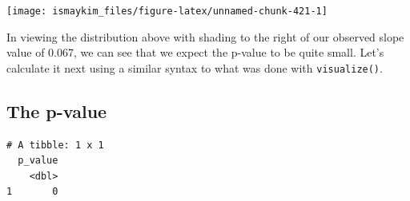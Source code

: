 \documentclass[12pt,]{krantz}
\makeatletter
\newenvironment{Shaded}{\begin{snugshade}}{\end{snugshade}}
\newcommand{\KeywordTok}[1]{\textcolor[rgb]{0.27,0.27,0.27}{\textbf{#1}}}
\newcommand{\DataTypeTok}[1]{\textcolor[rgb]{0.27,0.27,0.27}{#1}}
\newcommand{\DecValTok}[1]{\textcolor[rgb]{0.06,0.06,0.06}{#1}}
\newcommand{\StringTok}[1]{\textcolor[rgb]{0.5,0.5,0.5}{#1}}
\newcommand{\OperatorTok}[1]{\textcolor[rgb]{0.43,0.43,0.43}{\textbf{#1}}}
\newcommand{\NormalTok}[1]{#1}
\newenvironment{kframe}{%
\medskip{}
\setlength{\fboxsep}{.8em}
 \def\at@end@of@kframe{}%
 \ifinner\ifhmode%
  \def\at@end@of@kframe{\end{minipage}}%
  \begin{minipage}{\columnwidth}%
 \fi\fi%
 \def\FrameCommand##1{\hskip\@totalleftmargin \hskip-\fboxsep
 \colorbox{shadecolor}{##1}\hskip-\fboxsep
     \hskip-\linewidth \hskip-\@totalleftmargin \hskip\columnwidth}%
 \MakeFramed {\advance\hsize-\width
   \@totalleftmargin\z@ \linewidth\hsize
   \@setminipage}}%
 {\par\unskip\endMakeFramed%
 \at@end@of@kframe}
\renewenvironment{Shaded}{\begin{kframe}}{\end{kframe}}
\theoremstyle{definition}
\theoremstyle{definition}
\theoremstyle{definition}
\theoremstyle{remark}
\makeatother
\begin{document}
\begin{Shaded}
\end{Shaded}

\begin{Shaded}
\end{Shaded}

\begin{center}\texttt{[image: ismaykim\_files/figure-latex/unnamed-chunk-421-1]} \end{center}

In viewing the distribution above with shading to the right of our
observed slope value of 0.067, we can see that we expect the p-value to
be quite small. Let's calculate it next using a similar syntax to what
was done with \texttt{visualize()}.

\subsection{The p-value}\label{the-p-value-1}

\begin{Shaded}
\end{Shaded}

\begin{verbatim}
# A tibble: 1 x 1
  p_value
    <dbl>
1       0
\end{verbatim}
\end{document}
